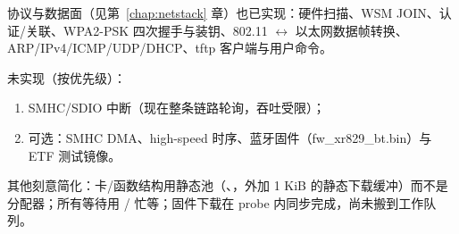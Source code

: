 协议与数据面（见第~\ref{chap:netstack} 章）也已实现：硬件扫描、WSM JOIN、认证/关联、WPA2-PSK 四次握手与装钥、802.11 $\leftrightarrow$ 以太网数据帧转换、ARP/IPv4/ICMP/UDP/DHCP、tftp 客户端与用户命令。

未实现（按优先级）：

\begin{enumerate}
  \item SMHC/SDIO 中断（现在整条链路轮询，吞吐受限）；
  \item 可选：SMHC DMA、high-speed 时序、蓝牙固件（fw\_xr829\_bt.bin）与 ETF 测试镜像。
\end{enumerate}

其他刻意简化：卡/函数结构用静态池（、，外加 1 KiB 的静态下载缓冲）而不是分配器；所有等待用 / 忙等；固件下载在 probe 内同步完成，尚未搬到工作队列。
